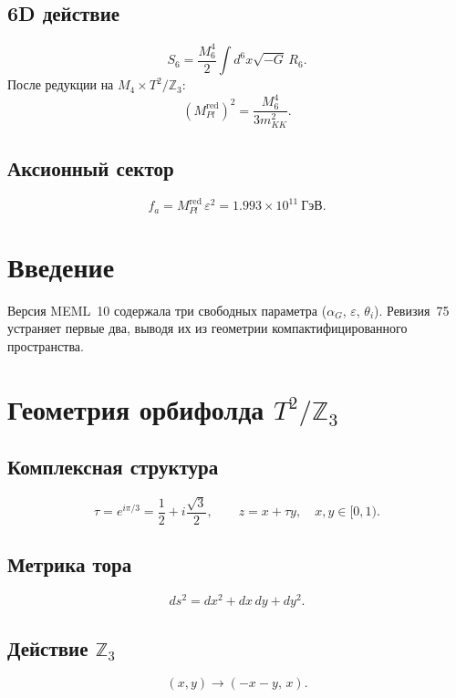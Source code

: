 \documentclass[12pt,a4paper]{article}
\numberwithin{equation}{section}
\begin{document}
\subsection{6D действие}
\begin{equation}
S_6 = \frac{M_6^4}{2}\int d^6x\sqrt{-G}\,R_6.
\end{equation}
После редукции на $M_4\times T^2/\mathbb{Z}_3$:
\begin{equation}
(M_{Pl}^{\text{red}})^2 = \frac{M_6^4}{3m_{KK}^2}.
\end{equation}

\subsection{Аксионный сектор}
\begin{equation}
\boxed{\;f_a = M_{Pl}^{\text{red}}\,\varepsilon^2 = 
1.993\times 10^{11}~\text{ГэВ}.\;}
\end{equation}

\section{Введение}
Версия MEML~10 содержала три свободных параметра ($\alpha_G$, 
$\varepsilon$, $\theta_i$). Ревизия~75 устраняет первые два, выводя 
их из геометрии компактифицированного пространства.

\section{Геометрия орбифолда $T^2/\mathbb{Z}_3$}

\subsection{Комплексная структура}
\begin{equation}
\tau = e^{i\pi/3} = \frac{1}{2} + i\frac{\sqrt3}{2}, \qquad 
z = x + \tau y, \quad x,y\in[0,1).
\end{equation}

\subsection{Метрика тора}
\begin{equation}
ds^2 = dx^2 + dx\,dy + dy^2.
\end{equation}

\subsection{Действие $\mathbb{Z}_3$}
\begin{equation}
(x,y) \to (-x-y,\, x).
\end{equation}
\end{document}
